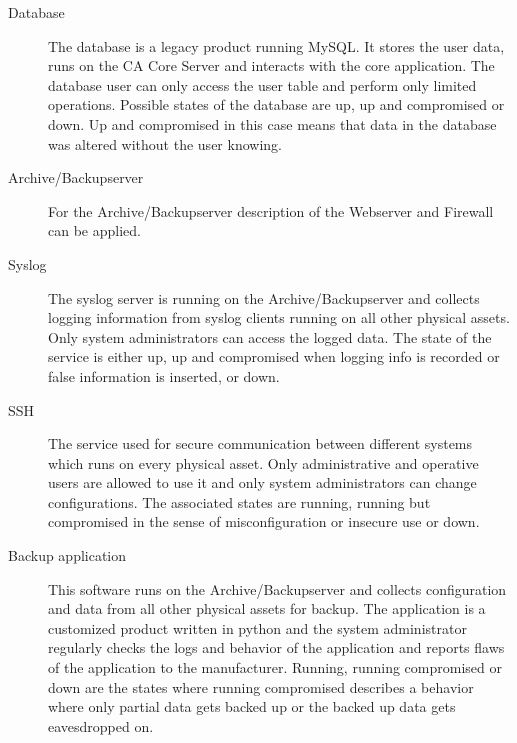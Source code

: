 \documentclass[a4paper, toc=index, 12pt, DIV14, twoside, BCOR2cm, headsepline, numbers=noenddot, bibliography=totoc]{scrbook}
\begin{document}
\begin{description}
\item[Database ] The database is a legacy product running MySQL. It stores the user data, runs on the CA Core Server and interacts with the core application. The database user can only access the user table and perform only limited operations. Possible states of the database are up, up and compromised or down. Up and compromised in this case means that data in the database was altered without the user knowing.
\item[Archive/Backupserver ] For the Archive/Backupserver description of the Webserver and Firewall can be applied.
\item[Syslog ] The syslog server is running on the Archive/Backupserver and collects logging information from syslog clients running on all other physical assets. Only system administrators can access the logged data. The state of the service is either up, up and compromised when logging info is recorded or false information is inserted, or down.
\item[SSH ] The service used for secure communication between different systems which runs on every physical asset. Only administrative and operative users are allowed to use it and only system administrators can change configurations. The associated states are running, running but compromised in the sense of misconfiguration or insecure use or down.
\item[Backup application ] This software runs on the Archive/Backupserver and collects configuration and data from all other physical assets for backup. The application is a customized product written in python and the system administrator regularly checks the logs and behavior of the application and reports flaws of the application to the manufacturer. Running, running compromised or down are the states where running compromised describes a behavior where only partial data gets backed up or the backed up data gets eavesdropped on.
\end{description}
\end{document}
